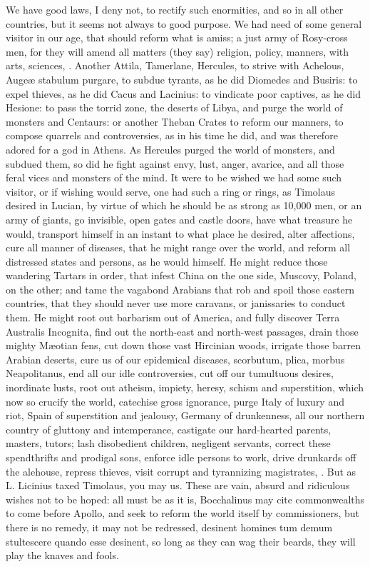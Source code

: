 {We have good laws, I deny not, to rectify such enormities, and so in
all other countries, but it seems not always to good purpose. We had
need of some general visitor in our age, that should reform what is
amiss; a just army of Rosy-cross men, for they will amend all matters
(they say) religion, policy, manners, with arts, sciences, \etc{}. Another
Attila, Tamerlane, Hercules, to strive with Achelous, Auge\ae{} stabulum
purgare, to subdue tyrants, as he did Diomedes and Busiris: to
expel thieves, as he did Cacus and Lacinius: to vindicate poor
captives, as he did Hesione: to pass the torrid zone, the deserts of
Libya, and purge the world of monsters and Centaurs: or another Theban
Crates to reform our manners, to compose quarrels and controversies, as
in his time he did, and was therefore adored for a god in Athens. As
Hercules purged the world of monsters, and subdued them, so did he
fight against envy, lust, anger, avarice, \etc{} and all those feral vices
and monsters of the mind. It were to be wished we had some such
visitor, or if wishing would serve, one had such a ring or rings, as
Timolaus desired in Lucian, by virtue of which he should be as
strong as 10,000 men, or an army of giants, go invisible, open gates
and castle doors, have what treasure he would, transport himself in an
instant to what place he desired, alter affections, cure all manner of
diseases, that he might range over the world, and reform all distressed
states and persons, as he would himself. He might reduce those
wandering Tartars in order, that infest China on the one side, Muscovy,
Poland, on the other; and tame the vagabond Arabians that rob and spoil
those eastern countries, that they should never use more caravans, or
janissaries to conduct them. He might root out barbarism out of
America, and fully discover Terra Australis Incognita, find out the
north-east and north-west passages, drain those mighty M\ae{}otian fens,
cut down those vast Hircinian woods, irrigate those barren Arabian
deserts, \etc{} cure us of our epidemical diseases, scorbutum, plica,
morbus Neapolitanus, \etc{} end all our idle controversies, cut off our
tumultuous desires, inordinate lusts, root out atheism, impiety,
heresy, schism and superstition, which now so crucify the world,
catechise gross ignorance, purge Italy of luxury and riot, Spain of
superstition and jealousy, Germany of drunkenness, all our northern
country of gluttony and intemperance, castigate our hard-hearted
parents, masters, tutors; lash disobedient children, negligent
servants, correct these spendthrifts and prodigal sons, enforce idle
persons to work, drive drunkards off the alehouse, repress thieves,
visit corrupt and tyrannizing magistrates, \etc{}. But as L. Licinius taxed
Timolaus, you may us. These are vain, absurd and ridiculous wishes not
to be hoped: all must be as it is, Bocchalinus may cite
commonwealths to come before Apollo, and seek to reform the world
itself by commissioners, but there is no remedy, it may not be
redressed, desinent homines tum demum stultescere quando esse desinent,
so long as they can wag their beards, they will play the knaves and
fools.

}
